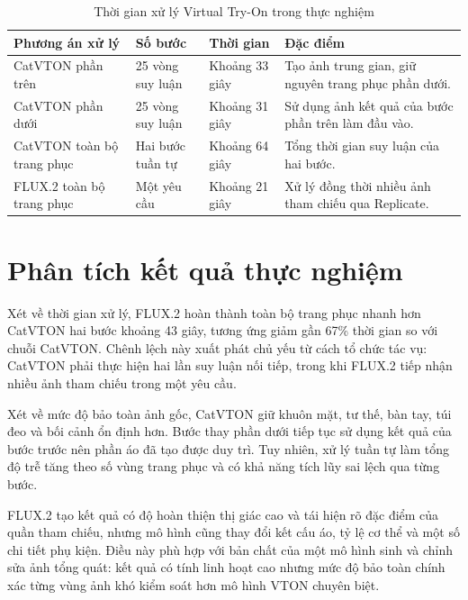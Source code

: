 \begin{table}[H]
\centering
\small
\caption{Thời gian xử lý Virtual Try-On trong thực nghiệm}
\label{tab:vton-observed-time}
\begin{tabularx}{\textwidth}{L{3.4cm}L{2.3cm}L{2.8cm}Y}
\toprule
\textbf{Phương án xử lý} & \textbf{Số bước} & \textbf{Thời gian} & \textbf{Đặc điểm} \\
\midrule
CatVTON phần trên & 25 vòng suy luận & Khoảng 33 giây & Tạo ảnh trung gian, giữ nguyên trang phục phần dưới. \\
\addlinespace
CatVTON phần dưới & 25 vòng suy luận & Khoảng 31 giây & Sử dụng ảnh kết quả của bước phần trên làm đầu vào. \\
\addlinespace
CatVTON toàn bộ trang phục & Hai bước tuần tự & Khoảng 64 giây & Tổng thời gian suy luận của hai bước. \\
\addlinespace
FLUX.2 toàn bộ trang phục & Một yêu cầu & Khoảng 21 giây & Xử lý đồng thời nhiều ảnh tham chiếu qua Replicate. \\
\bottomrule
\end{tabularx}
\end{table}

\section{Phân tích kết quả thực nghiệm}

Xét về thời gian xử lý, FLUX.2 hoàn thành toàn bộ trang phục nhanh hơn CatVTON hai bước khoảng 43 giây, tương ứng giảm gần 67\% thời gian so với chuỗi CatVTON. Chênh lệch này xuất phát chủ yếu từ cách tổ chức tác vụ: CatVTON phải thực hiện hai lần suy luận nối tiếp, trong khi FLUX.2 tiếp nhận nhiều ảnh tham chiếu trong một yêu cầu.

\medskip

Xét về mức độ bảo toàn ảnh gốc, CatVTON giữ khuôn mặt, tư thế, bàn tay, túi đeo và bối cảnh ổn định hơn. Bước thay phần dưới tiếp tục sử dụng kết quả của bước trước nên phần áo đã tạo được duy trì. Tuy nhiên, xử lý tuần tự làm tổng độ trễ tăng theo số vùng trang phục và có khả năng tích lũy sai lệch qua từng bước.

\medskip

FLUX.2 tạo kết quả có độ hoàn thiện thị giác cao và tái hiện rõ đặc điểm của quần tham chiếu, nhưng mô hình cũng thay đổi kết cấu áo, tỷ lệ cơ thể và một số chi tiết phụ kiện. Điều này phù hợp với bản chất của một mô hình sinh và chỉnh sửa ảnh tổng quát: kết quả có tính linh hoạt cao nhưng mức độ bảo toàn chính xác từng vùng ảnh khó kiểm soát hơn mô hình VTON chuyên biệt.

